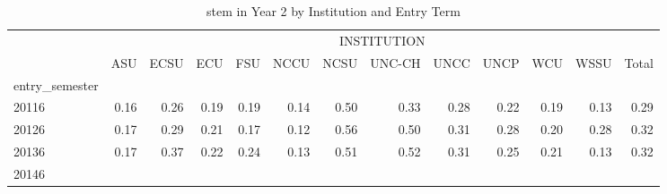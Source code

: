 \begin{table}[!h]
\caption{stem in Year 2 by Institution and Entry Term}
\centering
\begin{tabular}{lllllllllllll}
\cline{1-13}
\multicolumn{1}{c}{} &
  \multicolumn{12}{|c}{INSTITUTION} \\
\multicolumn{1}{c}{} &
  \multicolumn{1}{|r}{ASU} &
  \multicolumn{1}{r}{ECSU} &
  \multicolumn{1}{r}{ECU} &
  \multicolumn{1}{r}{FSU} &
  \multicolumn{1}{r}{NCCU} &
  \multicolumn{1}{r}{NCSU} &
  \multicolumn{1}{r}{UNC-CH} &
  \multicolumn{1}{r}{UNCC} &
  \multicolumn{1}{r}{UNCP} &
  \multicolumn{1}{r}{WCU} &
  \multicolumn{1}{r}{WSSU} &
  \multicolumn{1}{r}{Total} \\
\cline{1-13}
\multicolumn{1}{l}{entry\_semester} &
  \multicolumn{1}{|r}{} &
  \multicolumn{1}{r}{} &
  \multicolumn{1}{r}{} &
  \multicolumn{1}{r}{} &
  \multicolumn{1}{r}{} &
  \multicolumn{1}{r}{} &
  \multicolumn{1}{r}{} &
  \multicolumn{1}{r}{} &
  \multicolumn{1}{r}{} &
  \multicolumn{1}{r}{} &
  \multicolumn{1}{r}{} &
  \multicolumn{1}{r}{} \\
\multicolumn{1}{l}{\hspace{1em}20116} &
  \multicolumn{1}{|r}{0.16} &
  \multicolumn{1}{r}{0.26} &
  \multicolumn{1}{r}{0.19} &
  \multicolumn{1}{r}{0.19} &
  \multicolumn{1}{r}{0.14} &
  \multicolumn{1}{r}{0.50} &
  \multicolumn{1}{r}{0.33} &
  \multicolumn{1}{r}{0.28} &
  \multicolumn{1}{r}{0.22} &
  \multicolumn{1}{r}{0.19} &
  \multicolumn{1}{r}{0.13} &
  \multicolumn{1}{r}{0.29} \\
\multicolumn{1}{l}{\hspace{1em}20126} &
  \multicolumn{1}{|r}{0.17} &
  \multicolumn{1}{r}{0.29} &
  \multicolumn{1}{r}{0.21} &
  \multicolumn{1}{r}{0.17} &
  \multicolumn{1}{r}{0.12} &
  \multicolumn{1}{r}{0.56} &
  \multicolumn{1}{r}{0.50} &
  \multicolumn{1}{r}{0.31} &
  \multicolumn{1}{r}{0.28} &
  \multicolumn{1}{r}{0.20} &
  \multicolumn{1}{r}{0.28} &
  \multicolumn{1}{r}{0.32} \\
\multicolumn{1}{l}{\hspace{1em}20136} &
  \multicolumn{1}{|r}{0.17} &
  \multicolumn{1}{r}{0.37} &
  \multicolumn{1}{r}{0.22} &
  \multicolumn{1}{r}{0.24} &
  \multicolumn{1}{r}{0.13} &
  \multicolumn{1}{r}{0.51} &
  \multicolumn{1}{r}{0.52} &
  \multicolumn{1}{r}{0.31} &
  \multicolumn{1}{r}{0.25} &
  \multicolumn{1}{r}{0.21} &
  \multicolumn{1}{r}{0.13} &
  \multicolumn{1}{r}{0.32} \\
\multicolumn{1}{l}{\hspace{1em}20146} &

\end{tabular}
\end{table}
